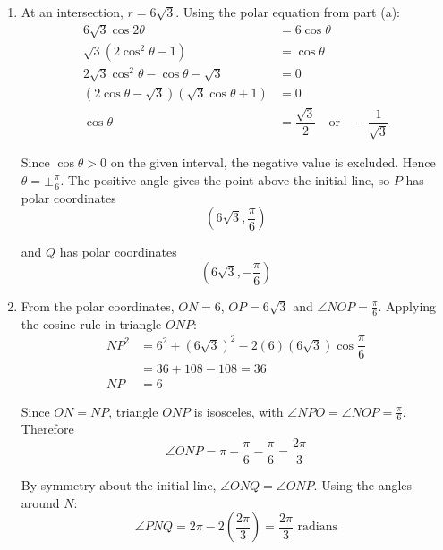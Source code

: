 \documentclass[leqno]{article}
\begin{document}
\begin{enumerate}[
  label=\textbf{\arabic*.},
  leftmargin=*,
  topsep=0pt,
  partopsep=0pt,
  parsep=0pt
]
\begin{djsSolution}
\begin{enumerate}[label=\textbf{(\alph*)}, start=1]
\begin{enumerate}[label=(\roman*), start=1]
Equality occurs only when \(\theta=0\), which gives \(r=6\). Thus \(N\) has polar coordinates
\[
(6,0)
\]

\item At an intersection, \(r=6\sqrt3\). Using the polar equation from part (a):
\begin{align*}
6\sqrt3\cos2\theta&=6\cos\theta\\
\sqrt3(2\cos^2\theta-1)&=\cos\theta\\
2\sqrt3\cos^2\theta-\cos\theta-\sqrt3&=0\\
(2\cos\theta-\sqrt3)(\sqrt3\cos\theta+1)&=0\\
\cos\theta&=\dfrac{\sqrt3}{2}\quad\text{or}\quad-\dfrac{1}{\sqrt3}
\end{align*}

Since \(\cos\theta>0\) on the given interval, the negative value is excluded. Hence \(\theta=\pm\frac{\pi}{6}\). The positive angle gives the point above the initial line, so \(P\) has polar coordinates
\[
\left(6\sqrt3,\dfrac{\pi}{6}\right)
\]

and \(Q\) has polar coordinates
\[
\left(6\sqrt3,-\dfrac{\pi}{6}\right)
\]

\item From the polar coordinates, \(ON=6\), \(OP=6\sqrt3\) and \(\angle NOP=\frac{\pi}{6}\). Applying the cosine rule in triangle \(ONP\):
\begin{align*}
NP^2&=6^2+(6\sqrt3)^2-2(6)(6\sqrt3)\cos\dfrac{\pi}{6}\\
&=36+108-108=36\\
NP&=6
\end{align*}

Since \(ON=NP\), triangle \(ONP\) is isosceles, with \(\angle NPO=\angle NOP=\frac{\pi}{6}\). Therefore
\[
\angle ONP=\pi-\dfrac{\pi}{6}-\dfrac{\pi}{6}=\dfrac{2\pi}{3}
\]

By symmetry about the initial line, \(\angle ONQ=\angle ONP\). Using the angles around \(N\):
\[
\angle PNQ=2\pi-2\left(\dfrac{2\pi}{3}\right)=\dfrac{2\pi}{3}\text{ radians}
\]

\end{enumerate}
\end{enumerate}
\end{djsSolution}

\end{enumerate}
\end{document}
